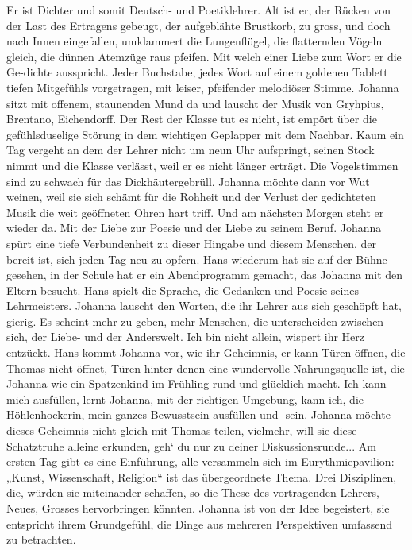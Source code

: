 Er ist Dichter und somit Deutsch- und Poetiklehrer. Alt ist er, der Rücken von der Last des Ertragens gebeugt, der aufgeblähte Brustkorb, zu gross, und doch nach Innen eingefallen, umklammert die Lungenflügel, die flatternden Vögeln gleich, die dünnen Atemzüge raus pfeifen. Mit welch einer Liebe zum Wort er die Ge-dichte ausspricht. Jeder Buchstabe, jedes Wort auf einem goldenen Tablett tiefen Mitgefühls vorgetragen, mit leiser, pfeifender melodiöser Stimme. Johanna sitzt mit offenem, staunenden Mund da und lauscht der Musik von Gryhpius, Brentano, Eichendorff. Der Rest der Klasse tut es nicht, ist empört über die gefühlsduselige Störung in dem wichtigen Geplapper mit dem Nachbar. Kaum ein Tag  vergeht an dem der Lehrer nicht um neun Uhr aufspringt, seinen Stock nimmt und die Klasse verlässt, weil er es nicht länger erträgt. Die Vogelstimmen sind zu schwach für das Dickhäutergebrüll. Johanna möchte dann vor Wut weinen, weil sie sich schämt für die Rohheit und der Verlust der gedichteten Musik die weit geöffneten Ohren hart triff.
Und am nächsten Morgen steht er wieder da. Mit der Liebe zur Poesie und der Liebe zu seinem Beruf. Johanna spürt eine tiefe Verbundenheit zu dieser Hingabe und diesem Menschen, der bereit ist, sich jeden Tag neu zu opfern.
Hans wiederum hat sie auf der Bühne gesehen, in der Schule hat er ein Abendprogramm gemacht, das Johanna mit den Eltern besucht. Hans spielt die Sprache, die Gedanken und Poesie seines Lehrmeisters. Johanna lauscht den Worten, die ihr Lehrer aus sich geschöpft hat, gierig. Es scheint mehr zu geben, mehr Menschen, die unterscheiden zwischen sich, der Liebe- und der Anderswelt. Ich bin nicht allein, wispert ihr Herz entzückt.
Hans kommt Johanna vor, wie ihr Geheimnis, er kann Türen öffnen, die Thomas nicht öffnet, Türen hinter denen eine wundervolle Nahrungsquelle ist, die Johanna wie ein Spatzenkind im Frühling rund und glücklich macht. Ich kann mich ausfüllen, lernt Johanna, mit der richtigen Umgebung, kann ich, die Höhlenhockerin, mein ganzes Bewusstsein ausfüllen und -sein. Johanna möchte dieses Geheimnis nicht gleich mit Thomas teilen, vielmehr, will sie diese Schatztruhe alleine erkunden, geh` du nur zu deiner Diskussionsrunde...
Am ersten Tag gibt es eine Einführung, alle versammeln sich im Eurythmiepavilion: „Kunst, Wissenschaft, Religion“ ist das übergeordnete Thema. Drei Disziplinen, die, würden sie miteinander schaffen, so die These des vortragenden Lehrers, Neues, Grosses hervorbringen könnten. Johanna ist von der Idee begeistert, sie entspricht ihrem Grundgefühl,  die Dinge aus mehreren Perspektiven umfassend zu betrachten.
